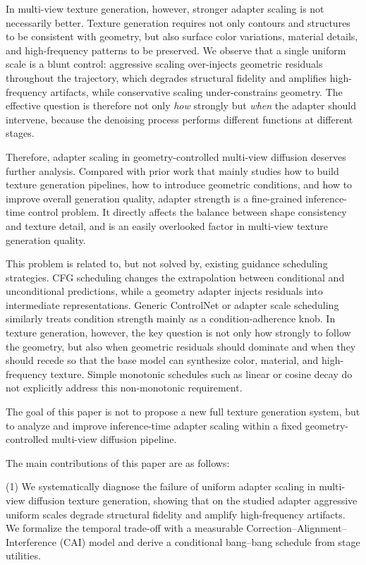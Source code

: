 \documentclass[times,twocolumn,final]{elsarticle}
\begin{document}
In multi-view texture generation, however, stronger adapter scaling is not necessarily better. Texture generation requires not only contours and structures to be consistent with geometry, but also surface color variations, material details, and high-frequency patterns to be preserved. We observe that a single uniform scale is a blunt control: aggressive scaling over-injects geometric residuals throughout the trajectory, which degrades structural fidelity and amplifies high-frequency artifacts, while conservative scaling under-constrains geometry. The effective question is therefore not only \emph{how} strongly but \emph{when} the adapter should intervene, because the denoising process performs different functions at different stages.

Therefore, adapter scaling in geometry-controlled multi-view diffusion deserves further analysis. Compared with prior work that mainly studies how to build texture generation pipelines, how to introduce geometric conditions, and how to improve overall generation quality, adapter strength is a fine-grained inference-time control problem. It directly affects the balance between shape consistency and texture detail, and is an easily overlooked factor in multi-view texture generation quality.

This problem is related to, but not solved by, existing guidance scheduling strategies. CFG scheduling changes the extrapolation between conditional and unconditional predictions, while a geometry adapter injects residuals into intermediate representations. Generic ControlNet or adapter scale scheduling similarly treats condition strength mainly as a condition-adherence knob. In texture generation, however, the key question is not only how strongly to follow the geometry, but also when geometric residuals should dominate and when they should recede so that the base model can synthesize color, material, and high-frequency texture. Simple monotonic schedules such as linear or cosine decay do not explicitly address this non-monotonic requirement.

The goal of this paper is not to propose a new full texture generation system, but to analyze and improve inference-time adapter scaling within a fixed geometry-controlled multi-view diffusion pipeline.

The main contributions of this paper are as follows:

(1) We systematically diagnose the failure of uniform adapter scaling in multi-view diffusion texture generation, showing that on the studied adapter aggressive uniform scales degrade structural fidelity and amplify high-frequency artifacts. We formalize the temporal trade-off with a measurable Correction--Alignment--Interference (CAI) model and derive a conditional bang--bang schedule from stage utilities.
\end{document}

